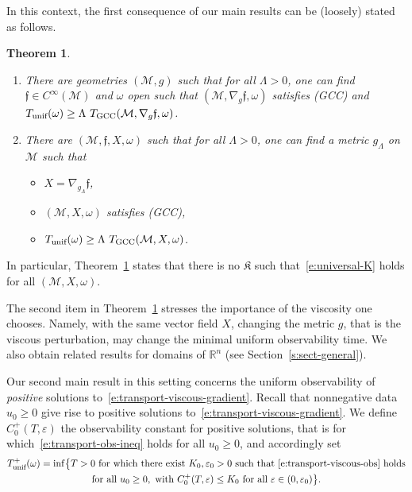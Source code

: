 \documentclass[10pt]{amsart}
\newcommand{\GCC}{\textup{GCC}}
\newcommand{\pGCC}{\textup{(GCC)}\xspace}
\newcommand{\unif}{\textup{unif}}
\newtheorem{theorem}[lemma]{Theorem}
\theoremstyle{definition}
\newcommand{\M}{\ensuremath{\mathcal M}}
\newcommand{\mb}[1]{\ensuremath{\mathbb{#1}}}
\newcommand{\R}{{\mb{R}}}
\newcommand{\f}{\ensuremath{\mathfrak{f}}}
\newcommand\nablag{\nabla_{g}}
\let\eps\varepsilon
\providecommand{\skpt}{\par\smallskip\noindent}
\begin{document}
In this context, the first consequence of our main results can be (loosely) stated as follows.

\skpt
\begin{theorem}
\label{t:loose}
\begin{enumerate}
\item There are geometries $(\M,g)$ such that for all $\Lambda>0$, one can find $\f \in C^\infty(\M)$ and $\omega$ open such that $(\M, \nablag \f, \omega)$ satisfies \pGCC and $T_{\unif}(\omega) \geq \Lambda \ T_{\GCC}(\M, \nablag \f, \omega)$.
\item There are $(\M,\f, X,\omega)$ such that for all $\Lambda>0$, one can find a metric $g_\Lambda$ on $\M$ such that
\begin{itemize}
\item $X = \nabla_{g_\Lambda}\f$,
\item $(\M, X, \omega)$ satisfies \pGCC,
\item $T_{\unif}(\omega) \geq \Lambda \ T_{\GCC}(\M, X, \omega)$.
\end{itemize}
\end{enumerate}
\end{theorem}
In particular, Theorem~\ref{t:loose} states that there is no $\mathfrak{K}$ such that~\eqref{e:universal-K} holds for all $(\M,X,\omega)$.

The second item in Theorem~\ref{t:loose} stresses the importance of the viscosity one chooses. Namely, with the same vector field $X$, changing the metric $g$, that is the viscous perturbation, may change the minimal uniform observability time.
We also obtain related results for domains of $\R^{n}$ (see Section~\ref{s:sect-general}).

Our second main result in this setting concerns the uniform observability of {\em positive} solutions to~\eqref{e:transport-viscous-gradient}. Recall that nonnegative data $u_0\geq 0$ give rise to positive solutions to~\eqref{e:transport-viscous-gradient}. We define $C_0^+(T,\eps)$ the observability constant for positive solutions, that is for which~\eqref{e:transport-obs-ineq} holds for all $u_0\geq0$, and accordingly set
\begin{multline}
\label{defTunif+}
T_{\unif}^+(\omega) = \inf \bigl\{ T >0 \text{ for which there exist }K_0, \eps_0>0 \text{ such that~\eqref{e:transport-viscous-obs} holds}\\
\text{for all }u_0\geq 0, \text{ with }C_0^+(T,\eps)\leq K_0 \text{ for all } \eps \in (0,\eps_0) \bigr\}.
\end{multline}
\end{document}
